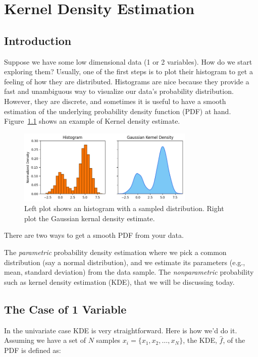 \chapter{Kernel Density Estimation}
\label{Kernel Density}

\section{Introduction}
Suppose we have some low dimensional data (1 or 2 variables). How do we start exploring them? Usually, one of the first steps is to plot their histogram to get a feeling of how they are distributed. Histograms are nice because they provide a fast and unambiguous way to visualize our data's probability distribution. However, they are discrete, and sometimes it is useful to have a smooth estimation of the underlying probability density function (PDF) at hand. Figure~\ref{fig:kde_example} shows an example of Kernel density estimate.


\begin{figure}[htb]
\centering
\includegraphics[width=0.75\textwidth]{figures/kde_example}
\caption{Left plot shows an histogram with a sampled distribution. Right plot the Gaussian kernal density estimate.}
\label{fig:kde_example}
\end{figure}

There are two ways to get a smooth PDF from your data.

The \emph{parametric} probability density estimation where we pick a common distribution (say a normal distribution), and we estimate its parameters (e.g., mean, standard deviation) from the data sample.
The \emph{nonparametric} probability such as kernel density estimation (KDE), that we will be discussing today.

\section{The Case of 1 Variable}
In the univariate case KDE is very straightforward. Here is how we'd do it. Assuming we have a set of $N$ samples $x_i=\{x_1,x_2,\ldots,x_N\}$, the KDE, $\hat{f}$, of the PDF is defined as:

